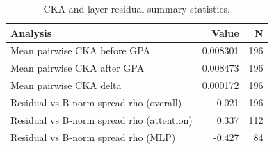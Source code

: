 \begin{table}[htbp]
\centering
\caption{CKA and layer residual summary statistics.}
\label{tab:alignment-summary}
\begin{tabular}{lrr}
\toprule
Analysis & Value & N \\
\midrule
Mean pairwise CKA before GPA & 0.008301 & 196 \\
Mean pairwise CKA after GPA & 0.008473 & 196 \\
Mean pairwise CKA delta & 0.000172 & 196 \\
Residual vs B-norm spread rho (overall) & -0.021 & 196 \\
Residual vs B-norm spread rho (attention) & 0.337 & 112 \\
Residual vs B-norm spread rho (MLP) & -0.427 & 84 \\
\bottomrule
\end{tabular}
\end{table}
